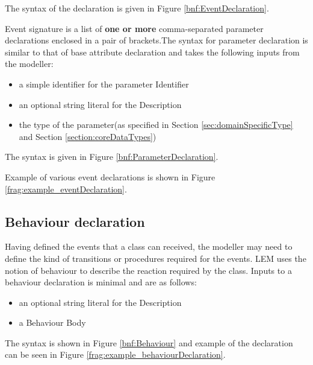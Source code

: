 The syntax of the declaration is given in Figure \ref{bnf:EventDeclaration}.\\


Event signature is a list of \textbf{one or more} comma-separated parameter declarations enclosed in a pair of brackets.The syntax for parameter declaration is similar to that of base attribute declaration and takes the following inputs from the modeller:

\begin{itemize}
\item a simple identifier for the parameter Identifier
\item an optional string literal for the Description
\item the type of the parameter(as specified in Section \ref{sec:domainSpecificType} and Section \ref{section:coreDataTypes}) 
\end{itemize}

The syntax is given in Figure \ref{bnf:ParameterDeclaration}.


Example of various event declarations is shown in Figure \ref{frag:example_eventDeclaration}.


\subsection{Behaviour declaration}\label{behaviourDeclaration}
Having defined the events that a class can received, the modeller may need to define the kind of transitions or procedures required for the events. LEM uses the notion of behaviour to describe the reaction required by the class. Inputs to a behaviour declaration is minimal and are as follows:

\begin{itemize}
\item an optional string literal for the Description
\item a Behaviour Body
\end{itemize}

The syntax is shown in Figure \ref{bnf:Behaviour} and example of the declaration can be seen in Figure \ref{frag:example_behaviourDeclaration}.


